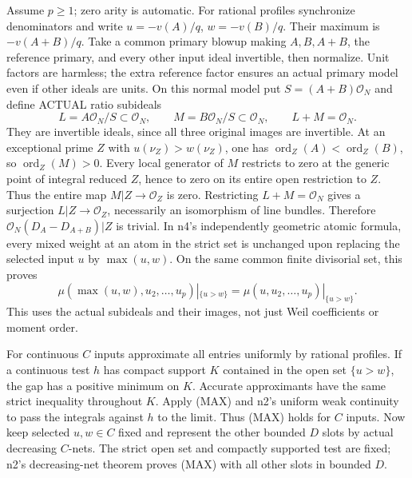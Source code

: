 Assume \(p\ge1\); zero arity is automatic. For rational profiles synchronize denominators and write \(u=-v(A)/q\), \(w=-v(B)/q\). Their maximum is \(-v(A+B)/q\). Take a common primary blowup making \(A,B,A+B\), the reference primary, and every other input ideal invertible, then normalize. Unit factors are harmless; the extra reference factor ensures an actual primary model even if other ideals are units. On this normal model put \(S=(A+B)\mathcal O_N\) and define ACTUAL ratio subideals
\[
L=A\mathcal O_N/S\subset\mathcal O_N,\qquad
M=B\mathcal O_N/S\subset\mathcal O_N,\qquad L+M=\mathcal O_N.
\]
They are invertible ideals, since all three original images are invertible. At an exceptional prime \(Z\) with \(u(\nu_Z)>w(\nu_Z)\), one has \(\operatorname{ord}_Z(A)<\operatorname{ord}_Z(B)\), so \(\operatorname{ord}_Z(M)>0\). Every local generator of \(M\) restricts to zero at the generic point of integral reduced \(Z\), hence to zero on its entire open restriction to \(Z\). Thus the entire map \(M|Z\to\mathcal O_Z\) is zero. Restricting \(L+M=\mathcal O_N\) gives a surjection \(L|Z\to\mathcal O_Z\), necessarily an isomorphism of line bundles. Therefore
\(\mathcal O_N(D_A-D_{A+B})|Z\) is trivial. In n4's independently geometric atomic formula, every mixed weight at an atom in the strict set is unchanged upon replacing the selected input \(u\) by \(\max(u,w)\). On the same common finite divisorial set, this proves
\[
\mu(\max(u,w),u_2,\ldots,u_p)|_{\{u>w\}}
=\mu(u,u_2,\ldots,u_p)|_{\{u>w\}}. \tag{MAX}
\]
This uses the actual subideals and their images, not just Weil coefficients or moment order.

For continuous \(C\) inputs approximate all entries uniformly by rational profiles. If a continuous test \(h\) has compact support \(K\) contained in the open set \(\{u>w\}\), the gap has a positive minimum on \(K\). Accurate approximants have the same strict inequality throughout \(K\). Apply (MAX) and n2's uniform weak continuity to pass the integrals against \(h\) to the limit. Thus (MAX) holds for \(C\) inputs. Now keep selected \(u,w\in C\) fixed and represent the other bounded \(D\) slots by actual decreasing \(C\)-nets. The strict open set and compactly supported test are fixed; n2's decreasing-net theorem proves (MAX) with all other slots in bounded \(D\).

